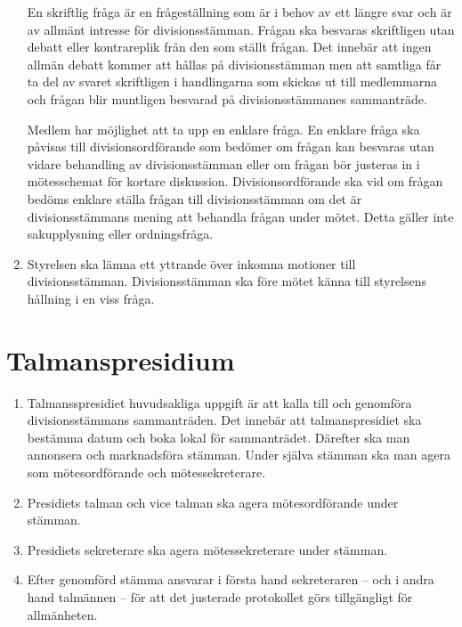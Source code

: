 \documentclass{dvd}
\begin{document}
\begin{enumerate}[label=\arabic* §, ref=\arabic*]
		En skriftlig fråga är en frågeställning som är i behov av ett längre svar och är av allmänt intresse för divisionsstämman.
		Frågan ska besvaras skriftligen utan debatt eller kontrareplik från den som ställt frågan.
		Det innebär att ingen allmän debatt kommer att hållas på divisionsstämman men att samtliga får ta del av svaret skriftligen i handlingarna som skickas ut till medlemmarna och frågan blir muntligen besvarad på divisionsstämmanes sammanträde.

		Medlem har möjlighet att ta upp en enklare fråga.
		En enklare fråga ska påvisas till divisionsordförande som bedömer om frågan kan besvaras utan vidare behandling av divisionsstämman eller om frågan bör justeras in i mötesschemat för kortare diskussion.
		Divisionsordförande ska vid om frågan bedöms enklare ställa frågan till divisionsstämman om det är divisionsstämmans mening att behandla frågan under mötet.
		Detta gäller inte sakupplysning eller ordningsfråga.

		\item Styrelsen ska lämna ett yttrande över inkomna motioner till divisionsstämman.
		Divisionsstämman ska före mötet känna till styrelsens hållning i en viss fråga.
	\end{enumerate}

	\section{Talmanspresidium}

	\begin{enumerate}[label=\arabic* §, ref=\arabic*]
		\item Talmansspresidiet huvudsakliga uppgift är att kalla till och genomföra divisionsstämmans sammanträden.
		Det innebär att talmanspresidiet ska bestämma datum och boka lokal för sammanträdet.
		Därefter ska man annonsera och marknadsföra stämman.
		Under själva stämman ska man agera som mötesordförande och mötessekreterare.

		\item Presidiets talman och vice talman ska agera mötesordförande under stämman.

		\item Presidiets sekreterare ska agera mötessekreterare under stämman.

		\item Efter genomförd stämma ansvarar i första hand sekreteraren -- och i andra hand talmännen -- för att det justerade protokollet görs tillgängligt för allmänheten.
	\end{enumerate}
\end{document}
